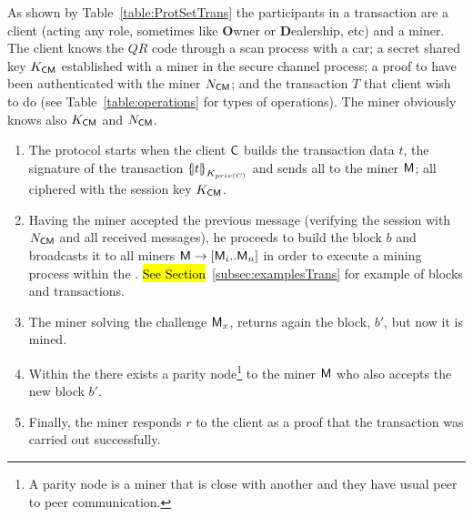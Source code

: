 As shown by Table~\ref{table:ProtSetTrans} the participants in a transaction 
are a client (acting any role, sometimes like \textbf{O}wner or \textbf{D}ealership, etc) and a miner.
The client knows the $QR$ code through a scan process with
a car; a secret shared key $K_{\textsf{C}\textsf{M}}$ established with
a miner in the secure channel process; a proof to have been authenticated
with the miner $N_{\textsf{C}\textsf{M}}$; and the transaction $T$ that client wish 
to do  (see Table~\ref{table:operations} for types of operations). 
The miner obviously knows also $K_{\textsf{C}\textsf{M}}$ and $N_{\textsf{C}\textsf{M}}$. 
\begin{enumerate}
    \item The protocol starts when the client $\textsf{C}$ builds the transaction 
        data $t$, the signature of the transaction $\fat{t}_{K_{priv(C)}}$ and sends
        all to the miner $\textsf{M}$; all ciphered with the 
        session key $K_{\textsf{C}\textsf{M}}$. 
    \item Having the miner accepted the previous message (verifying the  
        session with $N_{\textsf{C}\textsf{M}}$ and all received messages), he proceeds to build 
        the block $b$ and broadcasts it to all miners $\textsf{M}\rightarrow [\textsf{M}_i .. \textsf{M}_n]$
        in order to execute a mining process within the \blockchaincarnetwork.
        \hl{See Section}~\ref{subsec:examplesTrans} for example of blocks and transactions.

        
    \item The miner solving the challenge $\textsf{M}_x$, returns again the block, $b'$, 
        but now it is mined. 
    \item Within the \blockchaincarnetwork there exists a parity node\footnote{
            A parity node is a miner that is close with another and they have usual
            peer to peer communication.
        } to the miner $\textsf{M}$
        who also accepts the new block $b'$.
    \item Finally, the miner responds $r$ to the client as a proof that the transaction 
        was carried out successfully.
\end{enumerate}

